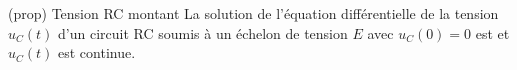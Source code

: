 \documentclass[../../main/main.tex]{subfiles}
\begin{document}
\begin{tcb*}[label=prop:ucsolu, sidebyside, righthand ratio=.3](prop)
  {Tension RC montant}
	La solution de l'équation différentielle de la tension $u_C(t)$
	d'un circuit RC soumis à un échelon de tension $E$ avec
	$u_C(0) = 0$ est
	\psw{%
		\[
			\boxed{u_C(t) = E\left(1-\exp\left(-\frac{t}{\tau}\right)\right)}
		\]
	}%
  et $u_C(t)$ est continue.
	\vspace{-15pt}
	\tcblower
	\begin{center}
	\end{center}
\end{tcb*}
\end{document}
